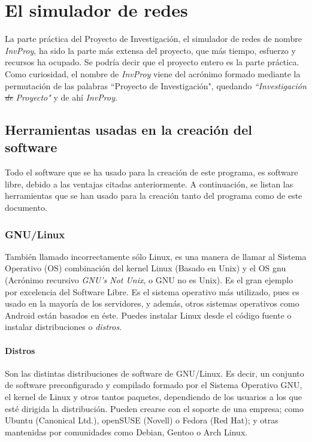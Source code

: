 \documentclass[a4paper, 11pt]{report} %
\begin{document}

\newcommand{\function}[1]{\texttt{\color{Orange}#1}}
\newcommand{\class}[1]{\texttt{\color{DarkRed}#1}}
\chapter{El simulador de redes}
La parte práctica del Proyecto de Investigación, el simulador de redes de nombre \textit{InvProy}, ha sido la parte más extensa del proyecto, que más tiempo, esfuerzo y recursos ha ocupado. Se podría decir que el proyecto entero es la parte práctica. Como curiosidad, el nombre de \textit{InvProy} viene del acrónimo formado mediante la permutación de las palabras ``Proyecto de Investigación", quedando \textit{``Investigación \sout{de} Proyecto"} y de ahí \textit{InvProy}.

\section{Herramientas usadas en la creación del software}
Todo el software que se ha usado para la creación de este programa, es software libre, debido a las ventajas citadas anteriormente. A continuación, se listan las herramientas que se han usado para la creación tanto del programa como de este documento.

\subsection{GNU/Linux}
También llamado incorrectamente sólo Linux, es una manera de llamar al Sistema Operativo (OS) combinación del kernel Linux (Basado en Unix) y el OS \acrshort{gnu} (Acrónimo recursivo \textit{GNU's Not Unix}, o GNU no es Unix). Es el gran ejemplo por excelencia del Software Libre. Es el sistema operativo más utilizado, pues es usado en la mayoría de los servidores, y además, otros sistemas operativos como Android están basados en éste. Puedes instalar Linux desde el código fuente o instalar distribuciones o \textit{distros}.

\subsubsection{Distros}
Son las distintas distribuciones de software de GNU/Linux. Es decir, un conjunto de software preconfigurado y compilado formado por el Sistema Operativo GNU, el kernel de Linux y otros tantos paquetes, dependiendo de los usuarios a los que esté dirigida la distribución. Pueden crearse con el soporte de una empresa; como Ubuntu (Canonical Ltd.), openSUSE (Novell) o Fedora (Red Hat); y otras mantenidas por comunidades como Debian, Gentoo o Arch Linux.
\end{document}
